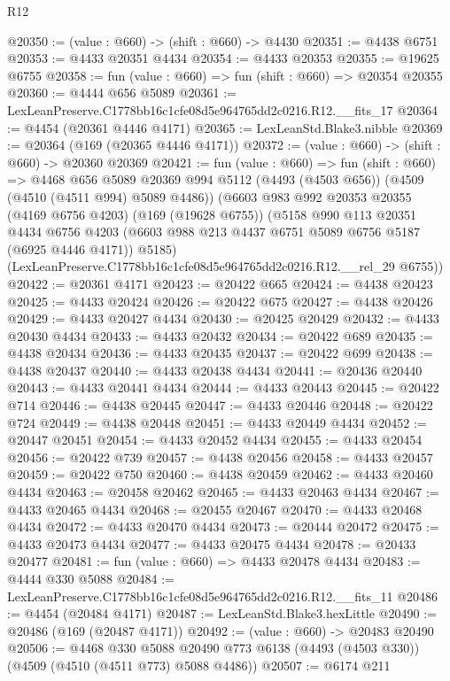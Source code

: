 \begin{lexlean}{R12}
\begin{coremodule}
@20350 := (value : @660) -> (shift : @660) -> @4430
@20351 := @4438 @6751
@20353 := @4433 @20351 @4434
@20354 := @4433 @20353
@20355 := @19625 @6755
@20358 := fun (value : @660) => fun (shift : @660) => @20354 @20355
@20360 := @4444 @656 @5089
@20361 := LexLeanPreserve.C1778bb16c1cfe08d5e964765dd2c0216.R12.__fits_17
@20364 := @4454 (@20361 @4446 @4171)
@20365 := LexLeanStd.Blake3.nibble
@20369 := @20364 (@169 (@20365 @4446 @4171))
@20372 := (value : @660) -> (shift : @660) -> @20360 @20369
@20421 := fun (value : @660) =>
  fun (shift : @660) =>
  @4468
    @656
    @5089
    @20369
    @994
    @5112
    (@4493 (@4503 @656))
    (@4509 (@4510 (@4511 @994) @5089 @4486))
    (@6603
      @983
      @992
      @20353
      @20355
      (@4169 @6756 @4203)
      (@169 (@19628 @6755))
      (@5158
        @990
        @113
        @20351
        @4434
        @6756
        @4203
        (@6603 @988 @213 @4437 @6751 @5089 @6756 @5187 (@6925 @4446 @4171))
        @5185)
      (LexLeanPreserve.C1778bb16c1cfe08d5e964765dd2c0216.R12.__rel_29 @6755))
@20422 := @20361 @4171
@20423 := @20422 @665
@20424 := @4438 @20423
@20425 := @4433 @20424
@20426 := @20422 @675
@20427 := @4438 @20426
@20429 := @4433 @20427 @4434
@20430 := @20425 @20429
@20432 := @4433 @20430 @4434
@20433 := @4433 @20432
@20434 := @20422 @689
@20435 := @4438 @20434
@20436 := @4433 @20435
@20437 := @20422 @699
@20438 := @4438 @20437
@20440 := @4433 @20438 @4434
@20441 := @20436 @20440
@20443 := @4433 @20441 @4434
@20444 := @4433 @20443
@20445 := @20422 @714
@20446 := @4438 @20445
@20447 := @4433 @20446
@20448 := @20422 @724
@20449 := @4438 @20448
@20451 := @4433 @20449 @4434
@20452 := @20447 @20451
@20454 := @4433 @20452 @4434
@20455 := @4433 @20454
@20456 := @20422 @739
@20457 := @4438 @20456
@20458 := @4433 @20457
@20459 := @20422 @750
@20460 := @4438 @20459
@20462 := @4433 @20460 @4434
@20463 := @20458 @20462
@20465 := @4433 @20463 @4434
@20467 := @4433 @20465 @4434
@20468 := @20455 @20467
@20470 := @4433 @20468 @4434
@20472 := @4433 @20470 @4434
@20473 := @20444 @20472
@20475 := @4433 @20473 @4434
@20477 := @4433 @20475 @4434
@20478 := @20433 @20477
@20481 := fun (value : @660) => @4433 @20478 @4434
@20483 := @4444 @330 @5088
@20484 := LexLeanPreserve.C1778bb16c1cfe08d5e964765dd2c0216.R12.__fits_11
@20486 := @4454 (@20484 @4171)
@20487 := LexLeanStd.Blake3.hexLittle
@20490 := @20486 (@169 (@20487 @4171))
@20492 := (value : @660) -> @20483 @20490
@20506 := @4468
    @330
    @5088
    @20490
    @773
    @6138
    (@4493 (@4503 @330))
    (@4509 (@4510 (@4511 @773) @5088 @4486))
@20507 := @6174 @211

\end{coremodule}
\end{lexlean}

